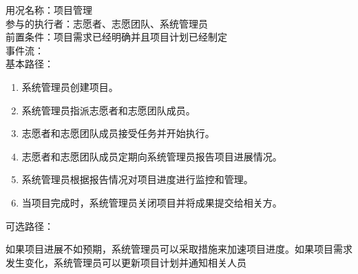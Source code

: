  \begin{framed} \noindent 
用况名称：项目管理\\ 
参与的执行者：志愿者、志愿团队、系统管理员\\
 前置条件：项目需求已经明确并且项目计划已经制定\\
 事件流： \\
基本路径： \begin{enumerate}[itemsep=2pt,topsep=0pt,parsep=0pt,itemindent=1em] \item 系统管理员创建项目。 \item 系统管理员指派志愿者和志愿团队成员。 \item 志愿者和志愿团队成员接受任务并开始执行。 \item 志愿者和志愿团队成员定期向系统管理员报告项目进展情况。 \item 系统管理员根据报告情况对项目进度进行监控和管理。 \item 当项目完成时，系统管理员关闭项目并将成果提交给相关方。 \end{enumerate} 
可选路径： \par 
如果项目进展不如预期，系统管理员可以采取措施来加速项目进度。如果项目需求发生变化，系统管理员可以更新项目计划并通知相关人员\\
\end{framed}


